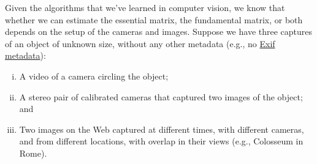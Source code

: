 \documentclass{csci1430}
\begin{document}
\begin{answer}[height=10]
\end{answer}


\pagebreak

\begin{question}[points=6,drawbox=false]
Given the algorithms that we've learned in computer vision, we know that whether we can estimate the essential matrix, the fundamental matrix, or both depends on the setup of the cameras and images. Suppose we have three captures of an object of unknown size, without any other metadata (e.g., no \href{https://en.wikipedia.org/wiki/Exif}{Exif metadata}):
\end{question}
%
\begin{enumerate}[(i),topsep=0pt,parsep=1pt]
\item A video of a camera circling the object;
\item A stereo pair of calibrated cameras that captured two images of the object; and
\item Two images on the Web captured at different times, with different cameras, and from different locations, with overlap in their views (e.g., Colosseum in Rome).
\end{enumerate}
\end{document}
